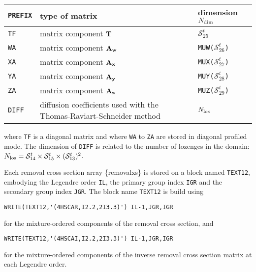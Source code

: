\vskip 0.3cm

\begin{tabular}{|l|l|l|}
\hline
{\tt PREFIX} & type of matrix & dimension $N_{\rm dim}$\\
\hline
{\tt TF} & matrix component $\bf{T}$ & $\mathcal{S}^{t}_{25}$ \\
{\tt WA} & matrix component $\bf{A}_w$ & {\tt MUW(}$\mathcal{S}^{t}_{26}${\tt )} \\
{\tt XA} & matrix component $\bf{A}_x$ & {\tt MUX(}$\mathcal{S}^{t}_{27}${\tt )} \\
{\tt YA} & matrix component $\bf{A}_y$ & {\tt MUY(}$\mathcal{S}^{t}_{28}${\tt )} \\
{\tt ZA} & matrix component $\bf{A}_z$ & {\tt MUZ(}$\mathcal{S}^{t}_{29}${\tt )} \\
{\tt DIFF} & diffusion coefficients used with the Thomas-Raviart-Schneider method &
$N_{\rm los}$ \\
\hline
\end{tabular}

\vskip 0.3cm

\noindent where {\tt TF} is a diagonal matrix and where {\tt WA} to {\tt ZA} are
stored in diagonal profiled mode. The dimension of {\tt DIFF} is related to the number of
lozenges in the domain: $N_{\rm los}=\mathcal{S}^{t}_{14}\times \mathcal{S}^{t}_{15}\times (\mathcal{S}^{t}_{13})^2$.

\vskip 0.3cm

Each removal cross section array \{removalxs\} is stored on a block named {\tt TEXT12}, embodying the Legendre order {\tt IL}, the primary
group index {\tt IGR} and the secondary group index {\tt JGR}. The block name {\tt TEXT12} is build using

\begin{verbatim}
WRITE(TEXT12,'(4HSCAR,I2.2,2I3.3)') IL-1,JGR,IGR
\end{verbatim}

\noindent for the mixture-ordered components of the removal cross section, and

\begin{verbatim}
WRITE(TEXT12,'(4HSCAI,I2.2,2I3.3)') IL-1,JGR,IGR
\end{verbatim}

\noindent for the mixture-ordered components of the inverse removal cross section matrix at each Legendre order.

\eject
